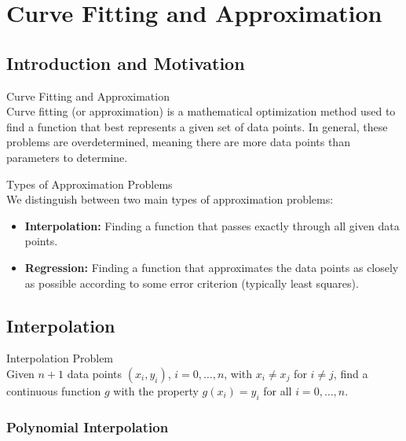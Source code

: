 

\section{Curve Fitting and Approximation}

\subsection{Introduction and Motivation}

\begin{definition}{Curve Fitting and Approximation}\\
Curve fitting (or approximation) is a mathematical optimization method used to find a function that best represents a given set of data points. In general, these problems are overdetermined, meaning there are more data points than parameters to determine.
\end{definition}

\begin{concept}{Types of Approximation Problems}\\
We distinguish between two main types of approximation problems:

\begin{itemize}
    \item \textbf{Interpolation:} Finding a function that passes exactly through all given data points.
    \item \textbf{Regression:} Finding a function that approximates the data points as closely as possible according to some error criterion (typically least squares).
\end{itemize}
\end{concept}

\subsection{Interpolation}

\begin{definition}{Interpolation Problem}\\
Given $n+1$ data points $(x_i, y_i)$, $i=0,\ldots,n$, with $x_i \neq x_j$ for $i \neq j$, find a continuous function $g$ with the property $g(x_i) = y_i$ for all $i=0,\ldots,n$.
\end{definition}

\subsubsection{Polynomial Interpolation}

